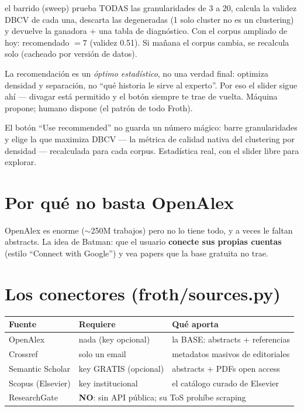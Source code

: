 \documentclass[11pt,a4paper]{article}
\begin{document}
\begin{concepto}{el barrido (sweep)}
 prueba TODAS las granularidades de 3 a 20,
calcula la validez DBCV de cada una, descarta las degeneradas (1 solo cluster no es un
clustering) y devuelve la ganadora + una tabla de diagnóstico. Con el corpus ampliado de
hoy: recomendado $= 7$ (validez 0.51). Si mañana el corpus cambia, se recalcula solo
(cacheado por versión de datos).
\end{concepto}

\begin{ojo}
La recomendación es un \emph{óptimo estadístico}, no una verdad final: optimiza densidad y
separación, no ``qué historia le sirve al experto''. Por eso el slider sigue ahí — divagar
está permitido y el botón siempre te trae de vuelta. Máquina propone; humano dispone
(el patrón de todo Froth).
\end{ojo}

\begin{resumen}
El botón ``Use recommended'' no guarda un número mágico: barre granularidades y elige la que
maximiza DBCV — la métrica de calidad nativa del clustering por densidad — recalculada para
cada corpus. Estadística real, con el slider libre para explorar.
\end{resumen}
\clearpage
{}
{}

\section{Por qué no basta OpenAlex}

OpenAlex es enorme ($\sim$250M trabajos) pero no lo tiene todo, y a veces le faltan
abstracts. La idea de Batman: que el usuario \textbf{conecte sus propias cuentas} (estilo
``Connect with Google'') y vea papers que la base gratuita no trae.

\section{Los conectores (froth/sources.py)}

\begin{center}
\begin{tabular}{lll}
\textbf{Fuente} & \textbf{Requiere} & \textbf{Qué aporta} \\
\hline
OpenAlex & nada (key opcional) & la BASE: abstracts + referencias \\
Crossref & solo un email & metadatos masivos de editoriales \\
Semantic Scholar & key GRATIS (opcional) & abstracts + PDFs open access \\
Scopus (Elsevier) & key institucional & el catálogo curado de Elsevier \\
ResearchGate & \multicolumn{2}{l}{\textbf{NO}: sin API pública; su ToS prohíbe scraping} \\
\end{tabular}
\end{center}
\end{document}

